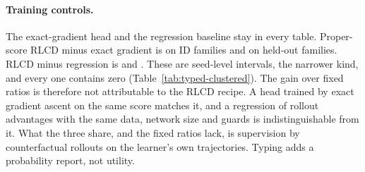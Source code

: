 \documentclass[10pt]{article}
\begin{document}
\paragraph{Training controls.}
The exact-gradient head and the regression baseline stay in every table. Proper-score RLCD minus exact gradient is \TypedAuditIdRlcdVsExact{} \TypedAuditIdRlcdVsExactSeed{} on ID families and \TypedAuditOodRlcdVsExact{} \TypedAuditOodRlcdVsExactSeed{} on held-out families. RLCD minus regression is \TypedAuditIdRlcdVsRegress{} \TypedAuditIdRlcdVsRegressSeed{} and \TypedAuditOodRlcdVsRegress{} \TypedAuditOodRlcdVsRegressSeed{}. These are seed-level intervals, the narrower kind, and every one contains zero (Table~\ref{tab:typed-clustered}). The gain over fixed ratios is therefore not attributable to the RLCD recipe. A head trained by exact gradient ascent on the same score matches it, and a regression of rollout advantages with the same data, network size and guards is indistinguishable from it. What the three share, and the fixed ratios lack, is supervision by counterfactual rollouts on the learner's own trajectories. Typing adds a probability report, not utility.

\begin{table}[t]
\centering\small
\resizebox{\linewidth}{!}{}
\caption{Four rules applied to the probabilities that the payoff-weighted policy reported on the states it visited. ``One decision'' is the mean rollout advantage over the base ratio of the single choice; ``closed loop'' is the test utility difference to the train-selected ratio when the rule runs the whole episode. The last row runs the hindsight label and is not a controller.}\label{tab:typed-rules}
\end{table}
\end{document}
